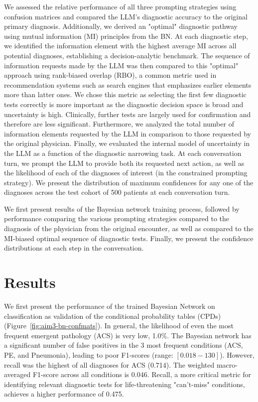 We assessed the relative performance of all three prompting strategies using confusion matrices and compared the LLM's diagnostic accuracy to the original primary diagnosis. Additionally, we derived an "optimal" diagnostic pathway using mutual information (MI) principles from the BN. At each diagnostic step, we identified the information element with the highest average MI across all potential diagnoses, establishing a decision-analytic benchmark. The sequence of information requests made by the LLM was then compared to this "optimal" approach using rank-biased overlap (RBO), a common metric used in recommendation systems such as search engines that emphasizes earlier elements more than latter ones\citep{webberSimilarityMeasureIndefinite2010}. We chose this metric as selecting the first few diagnostic tests correctly is more important as the diagnostic decision space is broad and uncertainty is high. Clinically, further tests are largely used for confirmation and therefore are less significant. Furthermore, we analyzed the total number of information elements requested by the LLM in comparison to those requested by the original physician. Finally, we evaluated the internal model of uncertainty in the LLM as a function of the diagnostic narrowing task. At each conversation turn, we prompt the LLM to provide both its requested next action, as well as the likelihood of each of the diagnoses of interest (in the constrained prompting strategy). We present the distribution of maximum confidences for any one of the diagnoses across the test cohort of 500 patients at each conversation turn. %

We first present results of the Bayesian network training process, followed by performance comparing the various prompting strategies compared to the diagnosis of the physician from the original encounter, as well as compared to the MI-biased optimal sequence of diagnostic tests. Finally, we present the confidence distributions at each step in the conversation.  

\section{Results}
We first present the performance of the trained Bayesian Network on classification as validation of the conditional probability tables (CPDs) (Figure~\ref{fig:aim3-bn-confmats}). In general, the likelihood of even the most frequent emergent pathology (ACS) is very low, 1.0\%. The Bayesian network has a significant number of false positives in the 3 most frequent conditions (ACS, PE, and Pneumonia), leading to poor F1-scores (range: $[0.018-130]$). However, recall was the highest of all diagnoses for ACS (0.714). The weighted macro-averaged F1-score across all conditions is 0.046. Recall, a more critical metric for identifying relevant diagnostic tests for life-threatening "can't-miss" conditions, achieves a higher performance of 0.475. 

